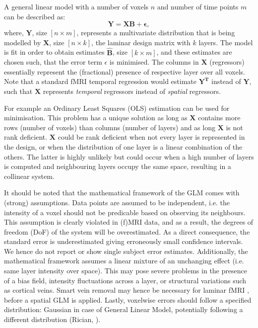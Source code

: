 A general linear model with a number of voxels $n$ and number of time points $m$ can be described as:
\begin{equation}
\mathbf{Y=X B +\epsilon},
\label{eq:glm}
\end{equation}
where, $\mathbf{Y}$, size $[n\times m]$, represents a multivariate distribution that is being modelled by $\mathbf{X}$, size $[n\times k]$, the laminar design matrix with $k$ layers. The model is fit in order to obtain estimates $\hat{\mathbf{B}}$, size $[k\times m]$, and these estimates are chosen such, that the error term $\epsilon$ is minimised.
The columns in $\mathbf{X}$ (regressors) essentially represent the (fractional) presence of respective layer over all voxels. Note that a standard fMRI temporal regression would estimate $\mathbf{Y^T}$ instead of $\mathbf{Y}$, such that $\mathbf{X}$ represents \emph{temporal} regressors instead of \emph{spatial} regressors.

For example an Ordinary Least Squares (OLS) estimation can be used for minimisation. This problem has a unique solution as long as $\mathbf{X}$ contains more rows (number of voxels) than columns (number of layers) and as long $\mathbf{X}$ is not rank deficient. $\mathbf{X}$ could be rank deficient when not every layer is represented in the design, or when the distribution of one layer is a linear combination of the others. The latter is highly unlikely but could occur when a high number of layers is computed and neighbouring layers occupy the same space, resulting in a collinear system.

It should be noted that the mathematical framework of the GLM comes with (strong) assumptions. Data points are assumed to be independent, i.e. the intensity of a voxel should not be predicable based on observing its neighbours. This assumption is clearly violated in (f)MRI data, and as a result, the degrees of freedom (DoF) of the system will be overestimated. As a direct consequence, the standard error is underestimated giving erroneously small confidence intervals. We hence do not report or show single subject error estimates. Additionally, the mathematical framework assumes a linear mixture of an unchanging effect (i.e. same layer intensity over space). This may pose severe problems in the presence of a bias field, intensity fluctuations across a layer, or structural variations such as cortical veins. Smart vein removal may hence be necessary for laminar fMRI \cite{Koopmans2010,Fracasso2017}, before a spatial GLM is applied. Lastly, voxelwise errors should follow a specified distribution: Gaussian in case of General Linear Model, potentially following a different distribution (Rician, \cite{Gudbjartsson1995}). %

